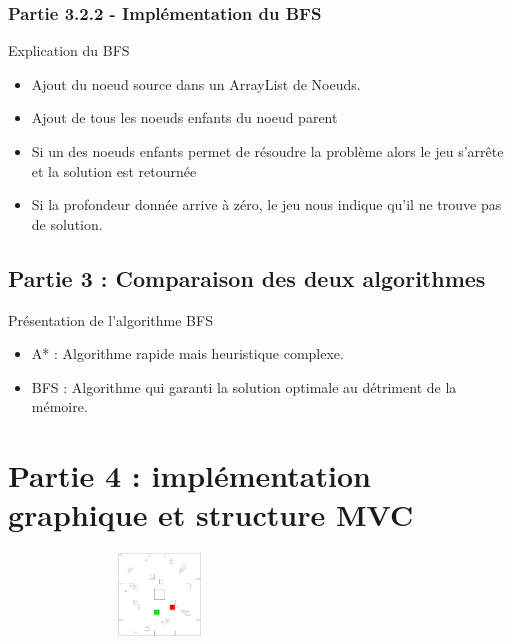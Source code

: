 \documentclass{beamer} %
\begin{document}
		\subsubsection{Partie 3.2.2 - Implémentation du BFS}
\begin{frame}[plain]
\begin{alertblock}{Explication du BFS}
	\begin{itemize}
		\item Ajout du noeud source dans un ArrayList de Noeuds.
		\item Ajout de tous les noeuds enfants du noeud parent
		\item Si un des noeuds enfants permet de résoudre la problème alors le jeu s'arrête et la solution est retournée
		\item Si la profondeur donnée arrive à zéro, le jeu nous indique qu'il ne trouve pas de solution.
	\end{itemize}
\end{alertblock}
\end{frame}


	\subsection{Partie 3 : Comparaison des deux algorithmes}
\begin{frame}[plain]
\begin{exampleblock}{Présentation de l'algorithme BFS}
	\begin{itemize}
		\item A* : Algorithme rapide mais heuristique complexe.
		\item BFS : Algorithme qui garanti la solution optimale au détriment de la mémoire.
	\end{itemize}
\end{exampleblock}


\end{frame}

\section{Partie 4 : implémentation graphique et structure MVC}
\begin{frame}[plain]
\includegraphics[height=2.2cm, width=8cm]{images/visuBoard.png}
\end{frame}
\end{document}
